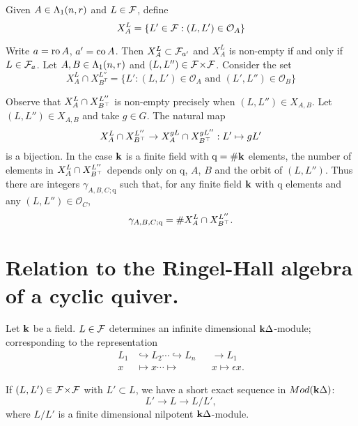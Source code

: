 \documentclass[a4paper, 11pt]{report}
\begin{document}
Given $A\in\Lambda_1(n,r)$ and $L\in\mathcal{F}$, define
\begin{equation*}
X_A^L = \{L'\in\mathcal{F}:(L,L')\in\mathcal{O}_A\}
\end{equation*}

Write $a=\operatorname{ro}{A}$, $a'=\operatorname{co}{A}$. Then $X_A^L \subset \mathcal{F}_{a'}$ and $X_A^L$ is non-empty if and only if $L\in\mathcal{F}_a$. Let $A,B\in\Lambda_1(n,r)$ and $(L,L'')\in{\mathcal{F}\!\times\!\mathcal{F}}$. Consider the set
\begin{equation*}
X_A^L\cap X_{B^T}^{L''} = \{L':(L,L')\in\mathcal{O}_A \text{ and } (L',L'')\in\mathcal{O}_B\}
\end{equation*}

Observe that $X_A^L\cap X_{B^\top}^{L''}$ is non-empty precisely when $(L,L'')\in X_{A,B}$. Let $(L,L'')\in X_{A,B}$ and take $g\in G$. The natural map
\begin{equation*}
X_A^L\cap X_{B^\top}^{L''}\to X_A^{gL}\cap X_{B^\top}^{gL''}:L'\mapsto gL'
\end{equation*}
is a bijection. In the case $\mathbf{k}$ is a finite field with $\mathrm{q}=\#\mathbf{k}$ elements, the number of elements in $X_A^L\cap X_{B^\top}^{L''}$ depends only on $\mathrm{q}$, $A$, $B$ and the orbit of $(L,L'')$. Thus there are integers $\gamma_{A,B,C;\mathrm{q}}$ such that, for any finite field $\mathbf{k}$ with $\mathrm{q}$ elements and any $(L,L'')\in\mathcal{O}_C$,
\begin{equation*}
\gamma_{A,B,C;\mathrm{q}} = \# X_A^L\cap X_{B^\top}^{L''}.
\end{equation*}

\section{Relation to the Ringel-Hall algebra of a cyclic quiver.}

Let $\mathbf{k}$ be a field. $L\in\mathcal{F}$ determines an infinite dimensional $\mathbf{k}\Delta$-module; corresponding to the representation
\begin{align*}
L_1 &\hookrightarrow L_2 \cdots\hookrightarrow L_n &&\to L_1\\
x &\mapsto x\cdots\mapsto && x\mapsto \epsilon x.
\end{align*}

If $(L,L')\in{\mathcal{F}\!\times\!\mathcal{F}}$ with $L'\subset L$, we have a short exact sequence in $Mod(\mathbf{k}\Delta)$:
\begin{equation*}
L'\to L\to L/{L'},
\end{equation*}
where $L/L'$ is a finite dimensional nilpotent $\mathbf{k}\Delta$-module.
\end{document}
